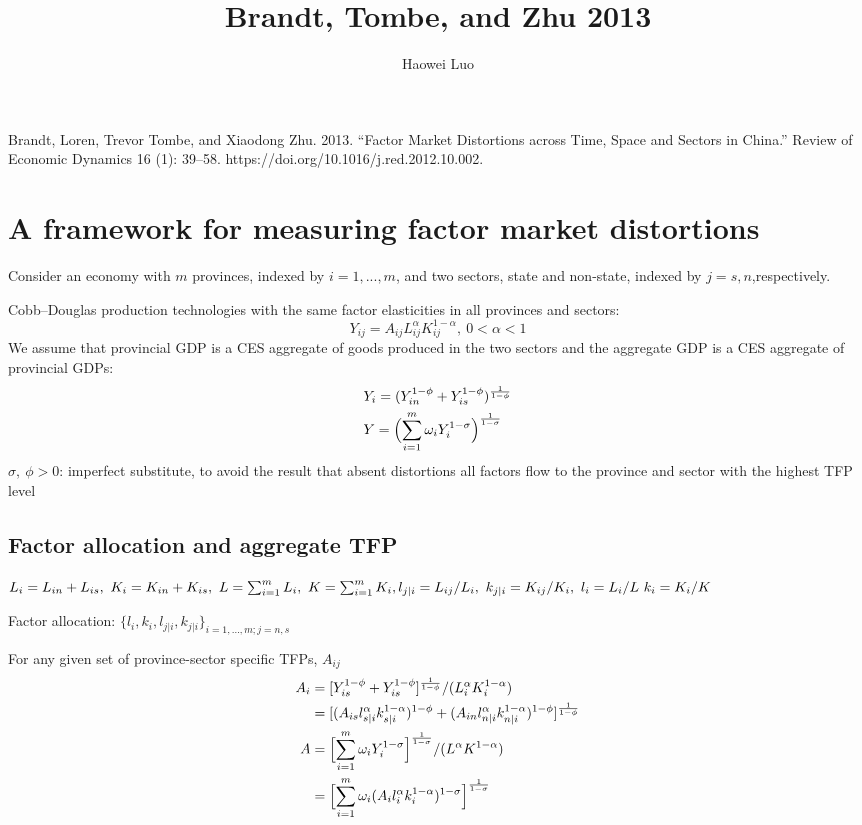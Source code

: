 \documentclass{article}
\title{Brandt, Tombe, and Zhu 2013}
\author{Haowei Luo}
\begin{document}
    \maketitle
    Brandt, Loren, Trevor Tombe, and Xiaodong Zhu. 2013. “Factor Market Distortions across Time, Space and Sectors in China.” Review of Economic Dynamics 16 (1): 39–58. https://doi.org/10.1016/j.red.2012.10.002.

    \section*{A framework for measuring factor market distortions}
    Consider an economy with $m$ provinces, indexed by $i = 1,...,m$, and two sectors, state and non-state, indexed by $j = s,n$,respectively.

    Cobb–Douglas production technologies with the same factor elasticities in all provinces and sectors:
    \begin{equation}
        Y_{ij}=A_{ij}L_{ij}^{\alpha}K_{ij}^{1-\alpha},\ 0<\alpha<1
    \end{equation}
    We assume that provincial GDP is a CES aggregate of goods produced in the two sectors and the aggregate GDP is a CES aggregate of provincial GDPs:
    \begin{align}
        &Y_i=(Y_{in}^{1-\phi}+Y_{is}^{1-\phi})^{\frac{1}{1-\phi}}\\
        &Y=\Bigl(\sum_{i=1}^m \omega_i Y_i^{1-\sigma}\Bigr)^{\frac{1}{1-\sigma}}
    \end{align}
    $\sigma,\ \phi>0$: imperfect substitute, to avoid the result that absent distortions all factors flow to the province and sector with the highest TFP level
    
    \subsection*{Factor allocation and aggregate TFP}
    $L_i=L_{in}+L_{is},\ K_i=K_{in}+K_{is},\ L=\sum_{i=1}^m L_i,\ K=\sum_{i=1}^m K_i,\\ l_{j|i}=L_{ij}/L_i,\ k_{j|i}=K_{ij}/K_i,\ l_i=L_i/L\ k_i=K_i/K$
    
    Factor allocation: $\{l_i,k_i,l_{j|i},k_{j|i}\}_{i=1,\dots,m;j=n,s}$

    For any given set of province-sector specific TFPs, $A_{ij}$
    \begin{align*}
        A_i&=[Y_{is}^{1-\phi}+Y_{is}^{1-\phi}]^{\frac{1}{1-\phi}}/(L_i^\alpha K_i^{1-\alpha})\\ & =[(A_{is} l_{s|i}^\alpha k_{s|i}^{1-\alpha})^{1-\phi}+(A_{in} l_{n|i}^\alpha k_{n|i}^{1-\alpha})^{1-\phi}]^{\frac{1}{1-\phi}}\\ A &=\Bigl[ \sum_{i=1}^m \omega_i Y_i^{1-\sigma} \Bigr]^{\frac{1}{1-\sigma}}/(L^\alpha K^{1-\alpha})\\ & =\Bigl[ \sum_{i=1}^m \omega_i (A_i l_i^\alpha k_i^{1-\alpha})^{1-\sigma}\Bigr]^{\frac{1}{1-\sigma}}
    \end{align*}
\end{document}
